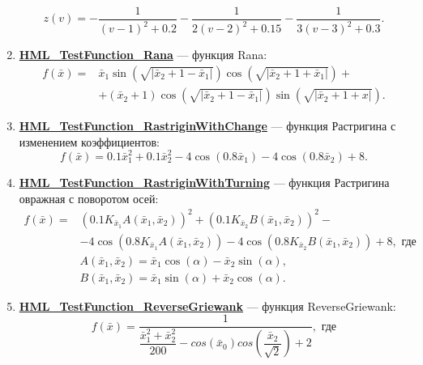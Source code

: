 \begin{enumerate}
\begin{equation*}
 z\left( v\right)= -\dfrac{1}{\left( v-1\right)^2+0.2 }-\dfrac{1}{2\left( v-2\right)^2+0.15}-\dfrac{1}{3\left( v-3\right)^2+0.3}.
 \end{equation*}
 \item \hyperref[TestFunctions:section:HML_TestFunction_Rana]{\textbf{HML\_TestFunction\_Rana}} --- функция Rana:
 \begin{align}
 f\left( \bar{x}\right) = & \bar{x}_1\sin\left( \sqrt{\left| \bar{x}_2+1-\bar{x}_1\right| }\right) \cos\left( \sqrt{\left| \bar{x}_2+1+\bar{x}_1\right| }\right)+  \\&+ (\bar{x}_2+1)\cos\left( \sqrt{\left| \bar{x}_2+1-\bar{x}_1\right| }\right) \sin\left( \sqrt{\left| \bar{x}_2+1+x\right| }\right).
 \end{align}
 \item \hyperref[TestFunctions:section:HML_TestFunction_RastriginWithChange]{\textbf{HML\_TestFunction\_RastriginWithChange}} --- функция Растригина с изменением коэффициентов:
 \begin{equation}
 f\left( \bar{x}\right) =0.1\bar{x}_1^2+0.1\bar{x}_2^2-4\cos\left( 0.8\bar{x}_1\right) -4\cos\left( 0.8\bar{x}_2\right) +8.
 \end{equation}
 \item \hyperref[TestFunctions:section:HML_TestFunction_RastriginWithTurning]{\textbf{HML\_TestFunction\_RastriginWithTurning}} --- функция Растригина овражная с поворотом осей:
 \begin{align}
 f\left( \bar{x}\right) =&{\left( 0.1 K_{\bar{x}_1}A\left( \bar{x}_1,\bar{x}_2\right) \right) }^2+{\left( 0.1 K_{\bar{x}_2}B\left( \bar{x}_1,\bar{x}_2\right) \right) }^2-
 \\&-4\cos\left( 0.8K_{\bar{x}_1}A\left( \bar{x}_1,\bar{x}_2\right)\right) -4\cos\left( 0.8K_{\bar{x}_2}B\left( \bar{x}_1,\bar{x}_2\right)\right) +8, \text{ где}\nonumber
 \\&A\left( \bar{x}_1,\bar{x}_2\right)= \bar{x}_1\cos\left( \alpha\right) -\bar{x}_2\sin\left( \alpha\right),\nonumber
 \\&B\left( \bar{x}_1,\bar{x}_2\right)= \bar{x}_1\sin\left( \alpha\right) +\bar{x}_2\cos\left( \alpha\right).\nonumber
 \end{align}
 \item \hyperref[TestFunctions:section:HML_TestFunction_ReverseGriewank]{\textbf{HML\_TestFunction\_ReverseGriewank}} --- функция ReverseGriewank:
 \begin{equation}
 f\left( \bar{x}\right) = \dfrac{1}{\dfrac{\bar{x}_1^2+\bar{x}_2^2}{200}-cos\left( \bar{x}_0\right)cos\left( \dfrac{\bar{x}_2}{\sqrt{2}}\right)+2  }, \text{ где}

\end{equation}
\end{enumerate}
